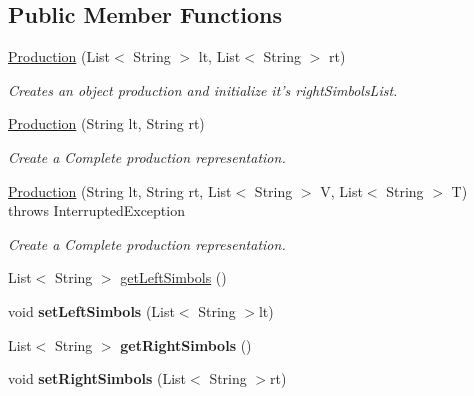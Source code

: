 \subsection*{Public Member Functions}
\begin{DoxyCompactItemize}
\item 
\hyperlink{classcontext_free_1_1grammar_1_1_production_aa793940d0a65f644495141b4fe4a86c0}{Production} (List$<$ String $>$ lt, List$<$ String $>$ rt)
\begin{DoxyCompactList}\small\item\em Creates an object production and initialize it's right\-Simbols\-List. \end{DoxyCompactList}\item 
\hyperlink{classcontext_free_1_1grammar_1_1_production_a1db3c4e260abdcac50a8425cc9bd901f}{Production} (String lt, String rt)
\begin{DoxyCompactList}\small\item\em Create a Complete production representation. \end{DoxyCompactList}\item 
\hyperlink{classcontext_free_1_1grammar_1_1_production_a70571ea099db67d650e87f0de16d684b}{Production} (String lt, String rt, List$<$ String $>$ V, List$<$ String $>$ T)  throws Interrupted\-Exception
\begin{DoxyCompactList}\small\item\em Create a Complete production representation. \end{DoxyCompactList}\item 
List$<$ String $>$ \hyperlink{classcontext_free_1_1grammar_1_1_production_aff0ed3fbde7f7a476a993936c27ddef7}{get\-Left\-Simbols} ()
\item 
\hypertarget{classcontext_free_1_1grammar_1_1_production_ae3030c00cadbd869bba5d382f8e4d06e}{void {\bfseries set\-Left\-Simbols} (List$<$ String $>$lt)}\label{classcontext_free_1_1grammar_1_1_production_ae3030c00cadbd869bba5d382f8e4d06e}

\item 
\hypertarget{classcontext_free_1_1grammar_1_1_production_a78a08f36758b1ad2699e04c48c04286a}{List$<$ String $>$ {\bfseries get\-Right\-Simbols} ()}\label{classcontext_free_1_1grammar_1_1_production_a78a08f36758b1ad2699e04c48c04286a}

\item 
\hypertarget{classcontext_free_1_1grammar_1_1_production_ac51e7fc47a11fb23641aa8a7ee905dc4}{void {\bfseries set\-Right\-Simbols} (List$<$ String $>$rt)}\label{classcontext_free_1_1grammar_1_1_production_ac51e7fc47a11fb23641aa8a7ee905dc4}


\end{DoxyCompactItemize}
